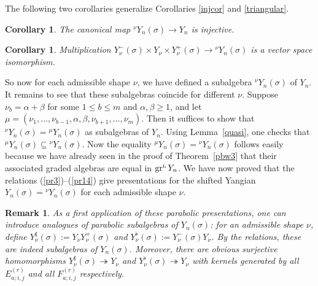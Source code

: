 \documentclass[twoside,12pt,reqno]{amsart}
\newtheorem{Corollary}[Proposition]{Corollary}
\newtheorem{Remark}[Proposition]{Remark}
\def\LL{{{\scriptscriptstyle\text{\rm{L}}}}}
\def\gr{\operatorname{gr}}
\begin{document}
The following two corollaries generalize Corollaries \ref{injcor} and 
\ref{triangular}.

\begin{Corollary}
The canonical map ${^\nu}Y_n(\sigma) \rightarrow Y_n$ is injective.
\end{Corollary}

\begin{Corollary}
Multiplication $Y_\nu^-(\sigma) \times Y_\nu \times Y_\nu^+(\sigma)
\rightarrow {^\nu}Y_n(\sigma)$ is a vector space isomorphism.
\end{Corollary}

So now for each admissible shape $\nu$, we have defined
a subalgebra ${^\nu}Y_n(\sigma)$ of $Y_n$. 
It remains to see that
these subalgebras coincide for different $\nu$.
Suppose $\nu_b = \alpha+\beta$ for some $1 \leq b \leq m$ and
$\alpha,\beta \geq 1$, and let
$\mu = (\nu_1,\dots,\nu_{b-1},\alpha,\beta,\nu_{b+1},\dots,\nu_m)$. 
Then it suffices to show that ${^\nu} Y_n(\sigma) = {^\mu}Y_n(\sigma)$
as subalgebras of $Y_n$.
Using Lemma~\ref{quasi}, one checks that
${^\mu}Y_n(\sigma) \subseteq {^\nu} Y_n(\sigma)$.
Now the equality ${^\mu}Y_n(\sigma) = {^\nu}Y_n(\sigma)$
follows easily because we have already seen in the proof of
Theorem~\ref{pbw3} that 
their associated graded algebras are equal in $\gr^\LL Y_n$.
We have now proved that the relations (\ref{pr3})--(\ref{pr14})
give presentations for the shifted Yangian $Y_n(\sigma)={^\nu}Y_n(\sigma)$
for each admissible shape $\nu$. 

\begin{Remark}\label{parrem}\rm
As a first application of 
these parabolic presentations, one can introduce
analogues of parabolic subalgebras of $Y_n(\sigma)$: for
an admissible shape $\nu$,
define $Y_\nu^\sharp(\sigma) := Y_\nu Y_\nu^+(\sigma)$
and $Y_\nu^\flat(\sigma) := Y_\nu^-(\sigma) Y_\nu$.
By the relations, these are indeed subalgebras of $Y_n(\sigma)$.
Moreover, there are obvious surjective homomorphisms
$Y_\nu^\sharp(\sigma) \twoheadrightarrow Y_\nu$
and 
$Y_\nu^\flat(\sigma) \twoheadrightarrow Y_\nu$ with kernels
generated by all $E_{a;i,j}^{(r)}$ and all
$F_{a;i,j}^{(r)}$ respectively.
\end{Remark}
\end{document}

